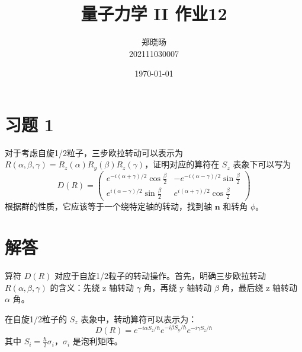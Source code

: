\documentclass{article}
\begin{document}
\title{量子力学 II 作业12}
\author{郑晓旸 \\ 202111030007}
\date{\today}
\maketitle
\section*{习题 1}

对于考虑自旋1/2粒子，三步欧拉转动可以表示为 \(R(\alpha,\beta,\gamma) = R_z(\alpha)R_y(\beta)R_z(\gamma)\)，证明对应的算符在 \(S_z\) 表象下可以写为
\[
D(R) =
\begin{pmatrix}
e^{-i(\alpha+\gamma)/2} \cos\frac{\beta}{2} & -e^{-i(\alpha-\gamma)/2} \sin\frac{\beta}{2} \\
e^{i(\alpha-\gamma)/2} \sin\frac{\beta}{2} & e^{i(\alpha+\gamma)/2} \cos\frac{\beta}{2}
\end{pmatrix}
\]
根据群的性质，它应该等于一个绕特定轴的转动，找到轴 \(\mathbf{n}\) 和转角 \(\phi\)。

\section*{解答}

算符 \(D(R)\) 对应于自旋1/2粒子的转动操作。首先，明确三步欧拉转动 \(R(\alpha,\beta,\gamma)\) 的含义：先绕 z 轴转动 \(\gamma\) 角，再绕 y 轴转动 \(\beta\) 角，最后绕 z 轴转动 \(\alpha\) 角。

在自旋1/2粒子的 \(S_z\) 表象中，转动算符可以表示为：
\[
D(R) = e^{-i\alpha S_z/\hbar} e^{-i\beta S_y/\hbar} e^{-i\gamma S_z/\hbar}
\]
其中 \(S_i = \frac{\hbar}{2}\sigma_i\)，\(\sigma_i\) 是泡利矩阵。
\end{document}
